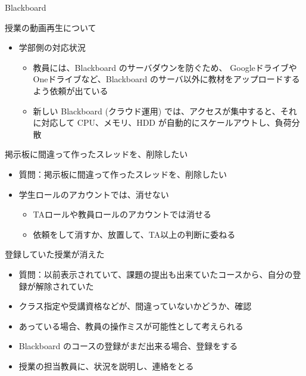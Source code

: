 \documentclass[a4j,10pt]{jsarticle}
\begin{document}
{\begin{frame}[label={sec:orgc119bb0},fragile]{Blackboard}
\begin{block}{授業の動画再生について}
\begin{itemize}
\begin{itemize}
\item 混み合っている時間帯では、ファイルのダウンロードに失敗したり、ダウンロードしてもファイルが破損していたりする
\item なお、教材のダウンロードを教員が許可しない設定の場合、「マウス右クリック」による保存はできない
\end{itemize}
\par
\item 学部側の対応状況
\begin{itemize}
\item 教員には、Blackboard のサーバダウンを防ぐため、 Googleドライブや Oneドライブなど、Blackboard のサーバ以外に教材をアップロードするよう依頼が出ている
\item 新しい Blackboard (クラウド運用) では、アクセスが集中すると、それに対応して CPU、メモリ、HDD が自動的にスケールアウトし、負荷分散
\end{itemize}
\end{itemize}
\end{block}
\par
\begin{block}{掲示板に間違って作ったスレッドを、削除したい}
\begin{itemize}
\item 質問：掲示板に間違って作ったスレッドを、削除したい
\par
\item 学生ロールのアカウントでは、消せない
\begin{itemize}
\item TAロールや教員ロールのアカウントでは消せる
\item 依頼をして消すか、放置して、TA以上の判断に委ねる
\end{itemize}
\end{itemize}
\end{block}
\par
\begin{block}{登録していた授業が消えた}
\begin{itemize}
\item 質問：以前表示されていて、課題の提出も出来ていたコースから、自分の登録が解除されていた
\par
\item クラス指定や受講資格などが、間違っていないかどうか、確認
\item あっている場合、教員の操作ミスが可能性として考えられる
\item Blackboard のコースの登録がまだ出来る場合、登録をする
\item 授業の担当教員に、状況を説明し、連絡をとる

\end{itemize}
\end{block}
\end{frame}}
\end{document}
